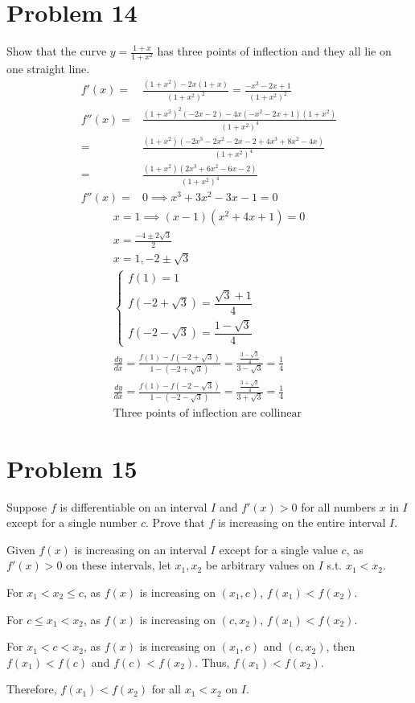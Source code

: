 \documentclass[12pt]{article}
\newcommand{\dydx}{\frac{dy}{dx}}
\newcommand{\vem}{\vspace{0.5em}}
\newcommand{\problem}[1]{\section{Problem #1}}
\begin{document}
\problem{14}
Show that the curve $\displaystyle y = \frac{1+x}{1+x^2}$ has three points of inflection and they all lie on one straight line.
\begin{align*}
    f'(x)=&\frac{(1+x^2)-2x(1+x)}{(1+x^2)^2}=\frac{-x^2-2x+1}{(1+x^2)^2}\\
    f''(x)=&\frac{(1+x^2)^2(-2x-2)-4x(-x^2-2x+1)(1+x^2)}{(1+x^2)^4}\\
    =&\frac{(1+x^2)(-2x^3-2x^2-2x-2+4x^3+8x^2-4x)}{(1+x^2)^4}\\
    =&\frac{(1+x^2)(2x^3+6x^2-6x-2)}{(1+x^2)^4}\\
    f''(x)=&0 \implies x^3+3x^2-3x-1=0
\end{align*}
\vspace{-2.5em}
\begin{gather*}
    x=1 \implies (x-1)(x^2+4x+1)=0\\
    x=\frac{-4\pm2\sqrt{3}}{2}\\
    \boxed{x=1,-2\pm \sqrt{3}}\\
    \begin{cases}
        f(1)=1\\
    f(-2+\sqrt{3})=\dfrac{\sqrt{3}+1}{4}\\
    f(-2-\sqrt{3})=\dfrac{1-\sqrt{3}}{4}
    \end{cases}\\
    \dydx=\frac{f(1)-f(-2+\sqrt{3})}{1-(-2+\sqrt{3})}=\frac{\frac{3-\sqrt{3}}{4}}{3-\sqrt{3}}=\frac{1}{4}\\
    \dydx=\frac{f(1)-f(-2-\sqrt{3})}{1-(-2-\sqrt{3})}=\frac{\frac{3+\sqrt{3}}{4}}{3+\sqrt{3}}=\frac{1}{4}\\
    \boxed{\text{Three points of inflection are collinear}}
\end{gather*}

\problem{15}
Suppose $f$ is differentiable on an interval $I$ and $f'(x) > 0$ for all numbers $x$ in $I$ except for a single number $c$. Prove that $f$ is increasing on the entire interval $I$. \vem

Given $f(x)$ is increasing on an interval $I$ except for a single value $c$, as $f'(x)>0$ on these intervals, let $x_1,x_2$ be arbitrary values on $I$ s.t. $x_1<x_2$. \vem

For $x_1<x_2 \le c$, as $f(x)$ is increasing on $(x_1,c)$, $f(x_1)<f(x_2)$. \vem

For $c \le x_1<x_2$, as $f(x)$ is increasing on $(c,x_2)$, $f(x_1)<f(x_2)$.\vem

For $x_1 < c< x_2$, as $f(x)$ is increasing on $(x_1,c)$ and $(c,x_2)$, then $f(x_1)<f(c)$ and $f(c)<f(x_2)$. Thus, $f(x_1)<f(x_2)$.\vem

Therefore, $f(x_1)<f(x_2)$ for all $x_1<x_2$ on $I$.
\end{document}
